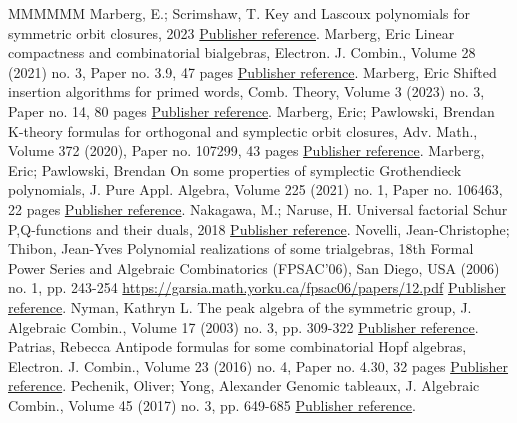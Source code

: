 \documentclass[11pt]{article}
\theoremstyle{definition}
\numberwithin{equation}{section}
\numberwithin{equation}{section}
\begin{document}
\begin{thebibliography}{MMMMMM}
 Marberg, E.; Scrimshaw, T. Key and Lascoux polynomials for symmetric orbit closures, 2023 \href{https://alco.centre-mersenne.org/articles/10.5802/alco.362/#MarScr2023}{Publisher reference}.
 Marberg, Eric Linear compactness and combinatorial bialgebras, Electron. J. Combin., Volume 28 (2021) no. 3, Paper no. 3.9, 47 pages \href{https://alco.centre-mersenne.org/articles/10.5802/alco.362/#Marberg2018}{Publisher reference}.
 Marberg, Eric Shifted insertion algorithms for primed words, Comb. Theory, Volume 3 (2023) no. 3, Paper no. 14, 80 pages \href{https://alco.centre-mersenne.org/articles/10.5802/alco.362/#Marberg2021}{Publisher reference}.
 Marberg, Eric; Pawlowski, Brendan K-theory formulas for orthogonal and symplectic orbit closures, Adv. Math., Volume 372 (2020), Paper no. 107299, 43 pages \href{https://alco.centre-mersenne.org/articles/10.5802/alco.362/#MP2020}{Publisher reference}.
 Marberg, Eric; Pawlowski, Brendan On some properties of symplectic Grothendieck polynomials, J. Pure Appl. Algebra, Volume 225 (2021) no. 1, Paper no. 106463, 22 pages \href{https://alco.centre-mersenne.org/articles/10.5802/alco.362/#MP2021}{Publisher reference}.
 Nakagawa, M.; Naruse, H. Universal factorial Schur P,Q-functions and their duals, 2018 \href{https://alco.centre-mersenne.org/articles/10.5802/alco.362/#NN2018}{Publisher reference}.
 Novelli, Jean-Christophe; Thibon, Jean-Yves Polynomial realizations of some trialgebras, 18th Formal Power Series and Algebraic Combinatorics (FPSAC’06), San Diego, USA (2006) no. 1, pp. 243-254 \url{https://garsia.math.yorku.ca/fpsac06/papers/12.pdf} \href{https://alco.centre-mersenne.org/articles/10.5802/alco.362/#NovelliThibon}{Publisher reference}.
 Nyman, Kathryn L. The peak algebra of the symmetric group, J. Algebraic Combin., Volume 17 (2003) no. 3, pp. 309-322 \href{https://alco.centre-mersenne.org/articles/10.5802/alco.362/#Nyman}{Publisher reference}.
 Patrias, Rebecca Antipode formulas for some combinatorial Hopf algebras, Electron. J. Combin., Volume 23 (2016) no. 4, Paper no. 4.30, 32 pages \href{https://alco.centre-mersenne.org/articles/10.5802/alco.362/#Patrias}{Publisher reference}.
 Pechenik, Oliver; Yong, Alexander Genomic tableaux, J. Algebraic Combin., Volume 45 (2017) no. 3, pp. 649-685 \href{https://alco.centre-mersenne.org/articles/10.5802/alco.362/#PechenikYong}{Publisher reference}.

\end{thebibliography}
\end{document}
